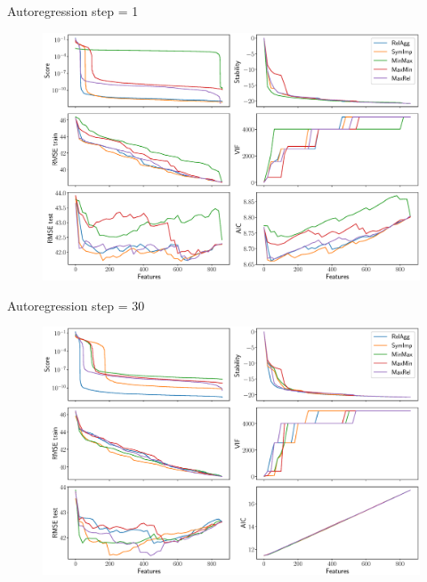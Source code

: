\documentclass[9pt]{beamer}
\begin{document}
\begin{frame}{Autoregression step = 1}
	\begin{figure}
		\includegraphics[width=\linewidth]{figs/ecog_3_1_metrics.eps}
	\end{figure}
\end{frame}
\begin{frame}{Autoregression step = 30}
	\begin{figure}
		\includegraphics[width=\linewidth]{figs/ecog_3_15_metrics.eps}
	\end{figure}
\end{frame}
\end{document}
